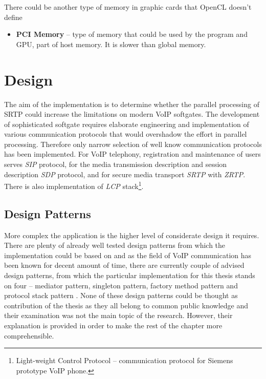 \hspace{-1.5em}
There could be another type of memory in graphic cards that OpenCL doesn't 
define

\begin{itemize}
\item \textbf{PCI Memory} -- type of memory that could be used by the program 
and GPU, part of host memory. It is slower than global memory.
\end{itemize}



\chapter{Design}\label{chapter:design}%
The aim of the implementation is to determine whether the parallel processing
of SRTP could increase the limitations on modern VoIP softgates. The development
of sophisticated softgate requires elaborate engineering and implementation
of various communication protocols that would overshadow the effort in parallel
processing. Therefore only narrow selection of well know communication protocols
has been implemented. For VoIP telephony, registration and maintenance of users
serves \textit{SIP} protocol, for the media transmission description
and session description \textit{SDP} protocol, and for secure media transport 
\textit{SRTP} with \textit{ZRTP}. There is also implementation of \textit{LCP} 
stack\footnote{ Light-weight Control Protocol -- communication protocol for
Siemens prototype VoIP phone.}.


\section{Design Patterns}
More complex the application is the higher level of considerate design it 
requires. There are plenty of already well tested design patterns from
which the implementation could be based on and as the field of VoIP
communication has been known for decent amount of time, there are currently
couple of advised design patterns, from which the particular implementation for 
this thesis stands on four -- mediator pattern, singleton pattern, factory 
method pattern \cite{design-patterns} and protocol stack pattern \cite{protocol-
stack}. None of these design patterns could be thought as contribution of the 
thesis as they all belong to common public knowledge and their examination was 
not the main topic of the  research. However, their explanation is provided in 
order to make the rest of the chapter more comprehensible.

